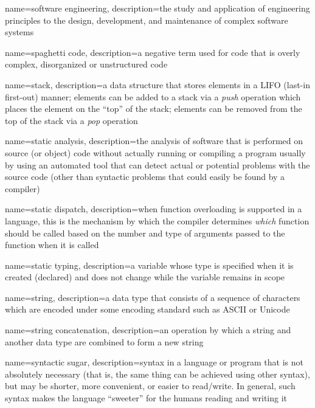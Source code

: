 {
  name=software engineering,
  description={the study and application of engineering principles to the design, development, and maintenance of complex software systems}
}

{
  name=spaghetti code,
  description={a negative term used for code that is overly complex, disorganized or unstructured code}
}

{
  name=stack,
  description={a data structure that stores elements in a LIFO (last-in first-out) manner; elements can be added to a stack via a \emph{push} operation which places the element on the ``top'' of the stack; elements can be removed from the top of the stack via a \emph{pop} operation}
}

{
  name=static analysis,
  description={the analysis of software that is performed on source (or object) code without actually running or compiling a program usually by using an automated tool that can detect actual or potential problems with the source code (other than syntactic problems that could easily be found by a compiler)}
}

{
  name=static dispatch,
  description={when function overloading is supported in a language, this is the mechanism by which the compiler determines \emph{which} function should be called based on the number and type of arguments passed to the function when it is called}
}

{
  name=static typing,
  description={a variable whose type is specified when it is created (declared) and does not change while the
  	variable remains in scope}
}

{
  name=string,
  description={a data type that consists of a sequence of characters which are encoded under some encoding standard such as ASCII or Unicode}
}

{
  name=string concatenation,
  description={an operation by which a string and another data type are combined to form a new string}
}

{
  name=syntactic sugar,
  description={syntax in a language or program that is not absolutely necessary (that is, the
  	same thing can be achieved using other syntax), but may be shorter, more convenient, or
	easier to read/write.  In general, such syntax makes the language ``sweeter'' for the
	humans reading and writing it}
}

